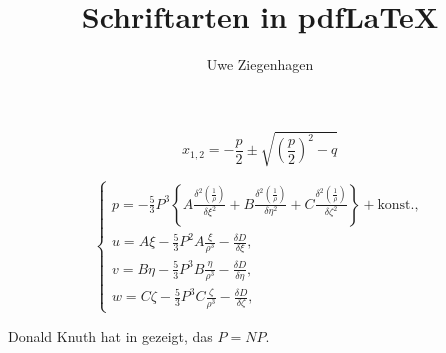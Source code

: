 \documentclass[12pt,ngerman,parskip=half]{scrartcl}
\title{Schriftarten in pdf\LaTeX}
\author{Uwe Ziegenhagen}
\begin{document}
\maketitle


\blindtext

\begin{equation}
x_{1,2} = -\frac{p}{2} \pm \sqrt{  \left( \frac{p}{2} \right) ^2 - q  }
\end{equation}


\blindtext

\begin{equation}
\left\{
\begin{array}{l}
p = - \frac{5}{3} P^3 \left\{A \frac{\delta^2 \left(\frac{1}{\rho} \right)}{\delta \xi^2} + B  \frac{\delta^2 \left(\frac{1}{\rho} \right)}{\delta \eta^2} + C \frac{\delta^2 \left(\frac{1}{\rho} \right)}{\delta \zeta^2} \right\} + \text{konst.}, \\
u = A \xi - \frac{5}{3} P^2 A \frac{\xi}{\rho^3} - \frac{\delta D}{\delta \xi}, \\
v = B \eta - \frac{5}{3} P^3 B \frac{\eta}{\rho^3} - \frac{\delta D}{\delta \eta}, \\
w = C \zeta - \frac{5}{3} P^3 C \frac{\zeta}{\rho^3} - \frac{\delta D}{\delta \zeta},
\end{array}
\right.
\end{equation}


\blindtext

Donald Knuth hat in \cite{knuth} gezeigt, das $P=NP$. 

\blindtext
\end{document}
